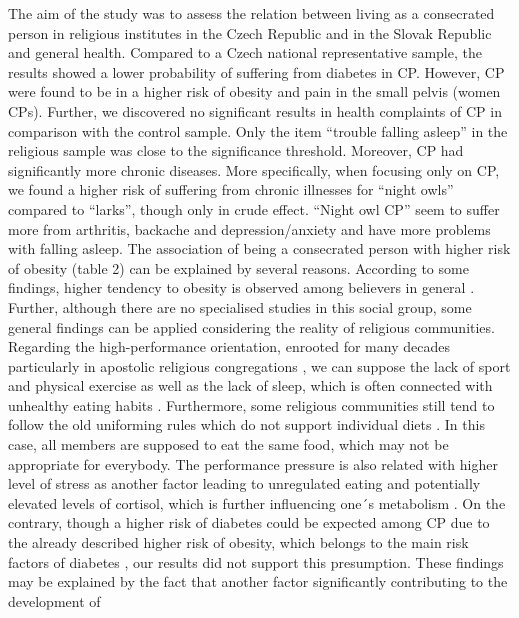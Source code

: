 \documentclass[ijerph,article,accept,moreauthors,pdftex]{mdpi}
\begin{document}
The aim of the study was to assess the relation between living as a
consecrated person in religious institutes in the Czech Republic and in
the Slovak Republic and general health. Compared to a Czech national
representative sample, the results showed a lower probability of
suffering from diabetes in CP. However, CP were found to be in a higher
risk of obesity and pain in the small pelvis (women CPs). Further, we
discovered no significant results in health complaints of CP in
comparison with the control sample. Only the item ``trouble falling
asleep'' in the religious sample was close to the significance
threshold. Moreover, CP had significantly more chronic diseases. More
specifically, when focusing only on CP, we found a higher risk of
suffering from chronic illnesses for ``night owls'' compared to
``larks'', though only in crude effect. ``Night owl CP'' seem to suffer
more from arthritis, backache and depression/anxiety and have more
problems with falling asleep. The association of being a consecrated
person with higher risk of obesity (table 2) can be explained by several
reasons. According to some findings, higher tendency to obesity is
observed among believers in general \citep{koenig2012religion}. Further,
although there are no specialised studies in this social group, some
general findings can be applied considering the reality of religious
communities. Regarding the high-performance orientation, enrooted for
many decades particularly in apostolic religious congregations
\citep{jakvsivcova2021sluzebnici}, we can suppose the lack of sport and
physical exercise as well as the lack of sleep, which is often connected
with unhealthy eating habits \citep{narcisse2018mediating}. Furthermore,
some religious communities still tend to follow the old uniforming rules
which do not support individual diets \citep{jakvsivcova2012dcery}. In
this case, all members are supposed to eat the same food, which may not
be appropriate for everybody. The performance pressure is also related
with higher level of stress as another factor leading to unregulated
eating \citep{ling2021relationships, leow2021understanding} and
potentially elevated levels of cortisol, which is further influencing
one´s metabolism \citep{kistenmacher2018psychosocial}. On the contrary,
though a higher risk of diabetes could be expected among CP due to the
already described higher risk of obesity, which belongs to the main risk
factors of diabetes \citep{brovz2020prevalence}, our results did not
support this presumption. These findings may be explained by the fact
that another factor significantly contributing to the development of
\end{document}

